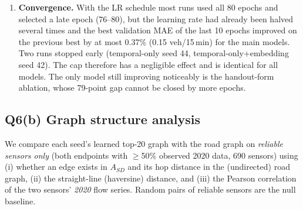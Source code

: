 \documentclass[11pt,a4paper]{article}
\begin{document}
\begin{enumerate}
(Apr--Dec 2021) has more missing data (Q3(a)) and different seasons than the Jan--Mar validation window, and 2021 traffic was
recovering from 2020 pandemic conditions. The gap is somewhat larger for the better models (22\% adaptive vs 16\% temporal-only),
which suggests that part of what the learned graph exploits is specific to 2020 patterns.
\item \textbf{Convergence.} With the LR schedule most runs used all 80 epochs and selected a late epoch (76--80), but the learning
rate had already been halved several times and the best validation MAE of the last 10 epochs improved on the previous best by at
most 0.37\% (0.15 veh/15\,min) for the main models. Two runs stopped early (temporal-only seed 44, temporal-only+embedding seed 42).
The cap therefore has a negligible effect and is identical for all models. The only model still improving noticeably is the
handout-form ablation, whose 79-point gap cannot be closed by more epochs.
\end{enumerate}

\subsection{Q6(b) Graph structure analysis}\label{sec:q6b}
We compare each seed's learned top-20 graph with the road graph on \emph{reliable sensors only} (both endpoints with $\geq$50\%
observed 2020 data, 690 sensors) using (i) whether an edge exists in $A_{SD}$ and its hop distance in the (undirected) road
graph, (ii) the straight-line (haversine) distance, and (iii) the Pearson correlation of the two sensors' \emph{2020} flow series.
Random pairs of reliable sensors are the null baseline.
\end{document}
